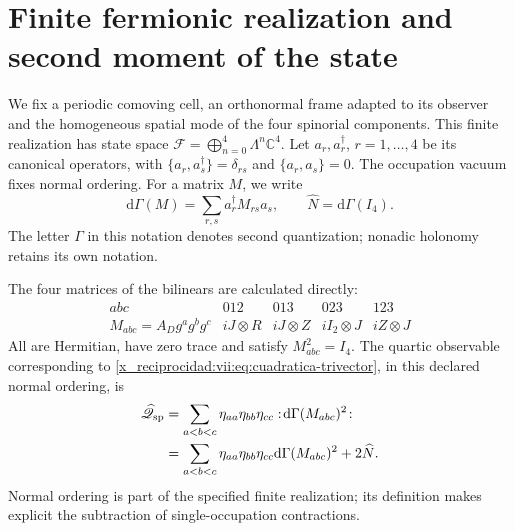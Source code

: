 \section{Finite fermionic realization and second moment of the state}
\label{x_reciprocidad:vii:subsec:segundo-momento-car}

We fix a periodic comoving cell, an orthonormal frame adapted to its
observer and the homogeneous spatial mode of the four spinorial
components. This finite realization has state space
\(\mathcal F=\bigoplus_{n=0}^4\Lambda^n\mathbb C^4\).
Let \(a_r,a_r^\dagger\), \(r=1,\ldots,4\) be its canonical
operators, with
\(\{a_r,a_s^\dagger\}=\delta_{rs}\) and
\(\{a_r,a_s\}=0\). The occupation vacuum fixes normal
ordering. For a matrix \(M\), we write
\[
 \mathrm d\Gamma(M)=\sum_{r,s}a_r^\dagger M_{rs}a_s,
 \qquad \widehat N=\mathrm d\Gamma(I_4).
\]
The letter \(\Gamma\) in this notation denotes second
quantization; nonadic holonomy retains its own notation.

The four matrices of the bilinears are calculated directly:
\begin{equation}
 \begin{array}{c|cccc}
 abc&012&013&023&123\\ \hline
 M_{abc}=A_Dg^ag^bg^c
       &iJ\otimes R&iJ\otimes Z&iI_2\otimes J&iZ\otimes J
 \end{array}
 \label{x_reciprocidad:vii:eq:matrices-bilineales-espin}
\end{equation}
All are Hermitian, have zero trace and satisfy
\(M_{abc}^2=I_4\). The quartic observable corresponding to
\eqref{x_reciprocidad:vii:eq:cuadratica-trivector}, in this declared normal ordering,
is
\begin{equation}
 \begin{split}
 \widehat{\mathscr Q}_{\rm sp}
 &=\sum_{a<b<c}\eta_{aa}\eta_{bb}\eta_{cc}
       :\!\mathrm d\Gamma(M_{abc})^2\!:\\
 &=\sum_{a<b<c}\eta_{aa}\eta_{bb}\eta_{cc}
       \mathrm d\Gamma(M_{abc})^2+2\widehat N.
 \end{split}
 \label{x_reciprocidad:vii:eq:observable-cuadratico-espin}
\end{equation}
Normal ordering is part of the specified finite realization;
its definition makes explicit the subtraction of single-occupation
contractions.

